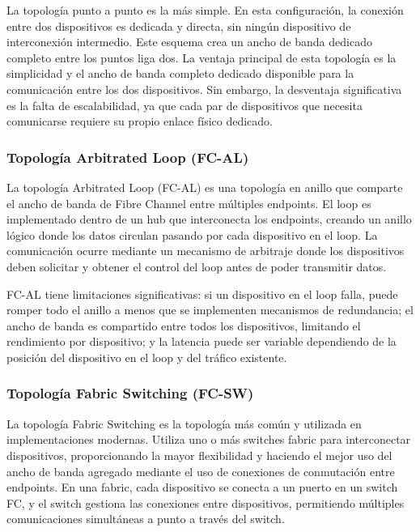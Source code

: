 La topología punto a punto es la más simple. En esta configuración, la conexión entre dos dispositivos es dedicada y directa, sin ningún dispositivo de interconexión intermedio. Este esquema crea un ancho de banda dedicado completo entre los puntos liga dos. La ventaja principal de esta topología es la simplicidad y el ancho de banda completo dedicado disponible para la comunicación entre los dos dispositivos. Sin embargo, la desventaja significativa es la falta de escalabilidad, ya que cada par de dispositivos que necesita comunicarse requiere su propio enlace físico dedicado.

\subsubsection{Topología Arbitrated Loop (FC-AL)}

La topología Arbitrated Loop (FC-AL) es una topología en anillo que comparte el ancho de banda de Fibre Channel entre múltiples endpoints. El loop es implementado dentro de un hub que interconecta los endpoints, creando un anillo lógico donde los datos circulan pasando por cada dispositivo en el loop. La comunicación ocurre mediante un mecanismo de arbitraje donde los dispositivos deben solicitar y obtener el control del loop antes de poder transmitir datos.

FC-AL tiene limitaciones significativas: si un dispositivo en el loop falla, puede romper todo el anillo a menos que se implementen mecanismos de redundancia; el ancho de banda es compartido entre todos los dispositivos, limitando el rendimiento por dispositivo; y la latencia puede ser variable dependiendo de la posición del dispositivo en el loop y del tráfico existente.

\subsubsection{Topología Fabric Switching (FC-SW)}

La topología Fabric Switching es la topología más común y utilizada en implementaciones modernas. Utiliza uno o más switches fabric para interconectar dispositivos, proporcionando la mayor flexibilidad y haciendo el mejor uso del ancho de banda agregado mediante el uso de conexiones de conmutación entre endpoints. En una fabric, cada dispositivo se conecta a un puerto en un switch FC, y el switch gestiona las conexiones entre dispositivos, permitiendo múltiples comunicaciones simultáneas a punto a través del switch.

